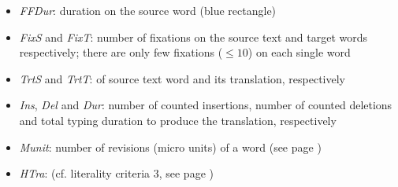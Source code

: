 \documentclass[output=paper]{LSP/langsci}
\begin{document}
\begin{itemize}
\item \textit{FFDur}:  duration on the source word (blue rectangle)
\item \textit{FixS} and \textit{FixT}: number of fixations on the source text and target words respectively; there are only few fixations ($\le 10$) on each single word
\item \textit{TrtS} and \textit{TrtT}:  of source text word and its translation, respectively
\item \textit{Ins}, \textit{Del} and \textit{Dur}: number of counted insertions, number of counted deletions and total typing duration to produce the translation, respectively
\item \textit{Munit}: number of revisions (micro units) of a word (see page \pageref{carl-schaeffer:sec:4.4})
\item \textit{HTra}:  (cf. literality criteria 3, see page \pageref{carl-schaeffer:sec:4.1})
\end{itemize}

\begin{table} 
\caption{Behavioural measures for smooth translation activities.}
\label{carl-schaeffer:tab:unchallenged}
\end{table} 
\end{document}
